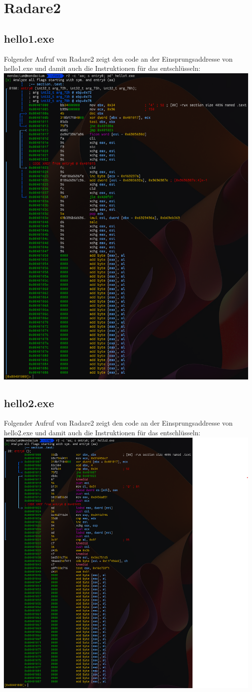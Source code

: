 \documentclass{article}
\begin{document}
	\section{Radare2}
	\subsection{hello1.exe}
	Folgender Aufruf von Radare2 zeigt den code an der Einsprungsaddresse von hello1.exe und damit auch die Instruktionen für das entschlüsseln:\\
	\includegraphics[width=0.5\linewidth]{pictures/hello1-radare2}\\
	
	\subsection{hello2.exe}
	Folgender Aufruf von Radare2 zeigt den code an der Einsprungsaddresse von hello2.exe und damit auch die Instruktionen für das entschlüsseln:\\
	\includegraphics[width=0.5\linewidth]{pictures/hello2-radare2}\\
	
\end{document}
